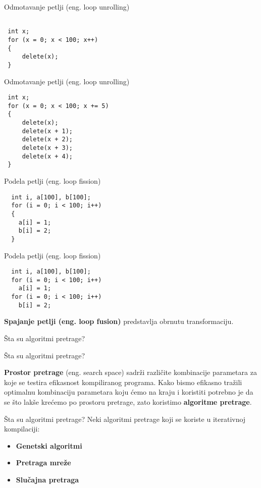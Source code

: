 \documentclass[10pt]{beamer}
\begin{document}
\begin{frame}[fragile]{Odmotavanje petlji (eng. loop unrolling)}
\begin{lstlisting}

 int x;
 for (x = 0; x < 100; x++)
 {
     delete(x);
 }
\end{lstlisting}
\end{frame}

\begin{frame}[fragile]{Odmotavanje petlji (eng. loop unrolling)}
\begin{lstlisting}
 int x; 
 for (x = 0; x < 100; x += 5)
 {
     delete(x);
     delete(x + 1);
     delete(x + 2);
     delete(x + 3);
     delete(x + 4);
 }
\end{lstlisting}
\end{frame}

\begin{frame}[fragile]{Podela petlji (eng. loop fission)}
\begin{lstlisting}
  int i, a[100], b[100];
  for (i = 0; i < 100; i++)
  {
    a[i] = 1; 
    b[i] = 2;
  }
\end{lstlisting}
\end{frame}

\begin{frame}[fragile]{Podela petlji (eng. loop fission)}
\begin{lstlisting}
  int i, a[100], b[100];
  for (i = 0; i < 100; i++)
    a[i] = 1;                     
  for (i = 0; i < 100; i++)
    b[i] = 2;
\end{lstlisting}
\textbf{Spajanje petlji (eng. loop fusion)} predstavlja obrnutu transformaciju.
\end{frame}

\begin{frame}[standout]
  Šta su algoritmi pretrage?
\end{frame}
\begin{frame}[fragile]{Šta su algoritmi pretrage?}

\textbf{Prostor pretrage} (eng. search space) sadrži različite kombinacije parametara za koje se testira efikasnost kompiliranog 
programa. Kako bismo efikasno tražili optimalnu kombinaciju parametara koju ćemo na kraju i koristiti potrebno je da se što 
lakše krećemo po prostoru pretrage, zato koristimo \textbf{algoritme pretrage}.
\end{frame}

\begin{frame}[fragile]{Šta su algoritmi pretrage?}
Neki algoritmi pretrage koji se koriste u iterativnoj kompilaciji:
\begin{itemize}[<+- | alert@+>]
    \item \textbf{Genetski algoritmi}
    \item \textbf{Pretraga mreže}
    \item \textbf{Slučajna pretraga}

  \end{itemize}
\end{frame}
\end{document}

